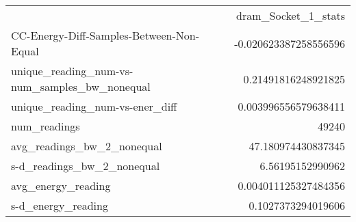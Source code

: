 \begin{tabular}{lr}
\toprule
{} &   dram_Socket_1_stats \\
CC-Energy-Diff-Samples-Between-Non-Equal & -0.020623387258556596 \\
unique_reading_num-vs-num_samples_bw_nonequal & 0.21491816248921825 \\
unique_reading_num-vs-ener_diff & 0.003996556579638411 \\
num_readings & 49240 \\
avg_readings_bw_2_nonequal & 47.180974430837345 \\
s-d_readings_bw_2_nonequal & 6.56195152990962 \\
avg_energy_reading & 0.004011125327484356 \\
s-d_energy_reading & 0.1027373294019606 \\
\bottomrule
\end{tabular}
